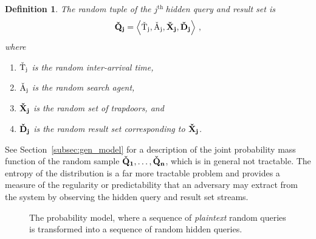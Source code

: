 \documentclass[final,11pt]{article}
\newcommand{\rvhrs}[1][]{%
   \ifthenelse{ \equal{#1}{} }
      {\ensuremath{\rv{\vec{\check{D}}}}}
      {\ensuremath{\rv{\vec{\check{D}_{#1}}}}}
}
\newcommand{\rvhqb}[1][]{%
   \ifthenelse{ \equal{#1}{} }
      {\ensuremath{\rv{\vec{\check{X}}}}}
      {\ensuremath{\rv{\vec{\check{X}_{#1}}}}}
}
\newcommand{\rvhts}[1][]{%
   \ifthenelse{ \equal{#1}{} }
      {\ensuremath{\rv{\check{T}}}}
      {\ensuremath{\rv{\check{T}_{#1}}}}
}
\newcommand{\rvhsa}[1][]{%
   \ifthenelse{ \equal{#1}{} }
      {\ensuremath{\rv{\check{A}}}}
      {\ensuremath{\rv{\check{A}_{#1}}}}
}
\newcommand{\rvhtup}[1][]{%
   \ifthenelse{ \equal{#1}{} }
      {\ensuremath{\rv{\vec{\check{Q}}}}}
      {\ensuremath{\rv{\vec{\check{Q}_{#1}}}}}
}
\newcommand{\rv}[1]{\mathrm{#1}}
\newcommand{\jth}{$j^{\text{th }}$}
\renewcommand{\vec}[1]{\boldsymbol{\mathbf{#1}}}
\numberwithin{equation}{section}
\theoremstyle{plain}
\newtheorem{definition}{Definition}[section]
\theoremstyle{remark}
\begin{document}
\begin{definition}
\label{def:hq_res_streams}
The \emph{random tuple} of the \jth hidden query and result set is
\begin{equation}
    \rvhtup[j] = \left\langle \rvhts[j], \rvhsa[j], \rvhqb[j], \rvhrs[j] \right\rangle\,,
\end{equation}
where
\begin{enumerate}
    \item [] $\rvhts[j]$ is the random inter-arrival time,
    \item [] $\rvhsa[j]$ is the random search agent,
    \item [] $\rvhqb[j]$ is the random set of trapdoors, and
    \item [] $\rvhrs[j]$ is the random result set corresponding to $\rvhqb[j]$.
\end{enumerate}
\end{definition}

See Section~\ref{subsec:gen_model} for a description of the joint probability mass function of the random sample $\rvhtup[1],\ldots,\rvhtup[n]$, which is in general not tractable. The entropy of the distribution is a far more tractable problem and provides a measure of the regularity or predictability that an adversary may extract from the system by observing the hidden query and result set streams.



\begin{figure}
    \centering
    
    \caption{The probability model, where a sequence of \emph{plaintext} random queries is transformed into a sequence of random hidden queries.}
    \label{fig:prob_model}
\end{figure}
\end{document}

